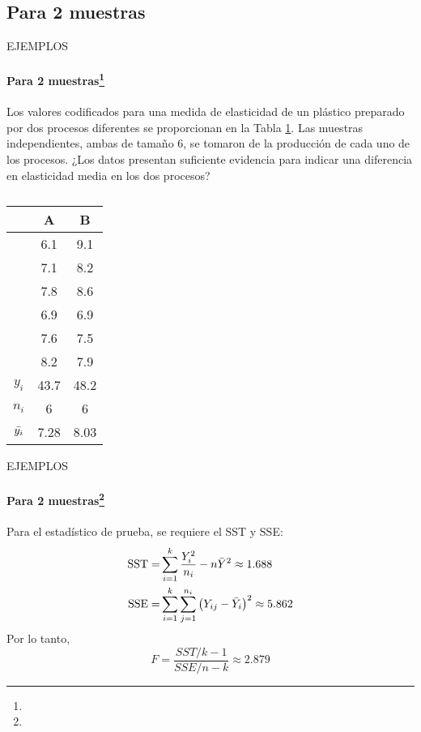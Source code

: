 \subsection{Para 2 muestras}
\begin{frame}{EJEMPLOS}
    \framesubtitle{Para 2 muestras\footnote{}}
    Los valores codificados para una medida de elasticidad de un plástico preparado por dos procesos diferentes se proporcionan en la Tabla \ref{tab:ejem2}. Las muestras independientes, ambas de tamaño 6, se tomaron de la producción de cada uno de los procesos. ¿Los datos presentan suficiente evidencia para indicar una diferencia en elasticidad media en los dos procesos?
    \begin{table}[H]
        \begin{tabular}{ccc}
        \hline
                     & \textbf{A}    & \textbf{B}    \\ \hline
                     & 6.1  & 9.1  \\
                     & 7.1  & 8.2  \\
                     & 7.8  & 8.6  \\
                     & 6.9  & 6.9  \\
                     & 7.6  & 7.5  \\
                     & 8.2  & 7.9  \\ \hline
        $y_i$        & 43.7 & 48.2 \\
        $n_i$        & 6    & 6    \\
        $\Bar{y_i}$ & 7.28 & 8.03 \\ \hline
        \end{tabular}
        \caption{}
        \label{tab:ejem2}
    \end{table}
\end{frame}

\begin{frame}{EJEMPLOS}
\framesubtitle{Para 2 muestras\footnote{}}
    Para el estadístico de prueba, se requiere el SST y SSE:
    \begin{equation*}
        \begin{split} \text{SST}=&\sum_{i=1}^{k}\dfrac{Y_i^2}{n_i}-n\Bar{Y}^2\approx1.688 \\\text{SSE}=&\sum_{i=1}^{k}\sum_{j=1}^{n_i}\left(Y_{ij}-\Bar{Y}_i\right)^2\approx 5.862
        \end{split}
    \end{equation*}
    Por lo tanto,
    \begin{equation*}
        F=\dfrac{SST\Big/k-1}{SSE\Big/n-k}\approx 2.879
    \end{equation*}
    
\end{frame}

